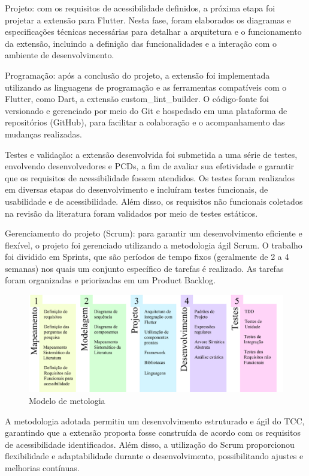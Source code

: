 Projeto: com os requisitos de acessibilidade definidos, a próxima etapa foi projetar a extensão para Flutter. Nesta fase, foram elaborados os diagramas e especificações técnicas necessárias para detalhar a arquitetura e o funcionamento da extensão, incluindo a definição das funcionalidades e a interação com o ambiente de desenvolvimento.

Programação: após a conclusão do projeto, a extensão foi implementada utilizando as linguagens de programação e as ferramentas compatíveis com o Flutter, como Dart, a extensão custom\_lint\_builder. O código-fonte foi versionado e gerenciado por meio do Git e hospedado em uma plataforma de repositórios (GitHub), para facilitar a colaboração e o acompanhamento das mudanças realizadas.

Testes e validação: a extensão desenvolvida foi submetida a uma série de testes, envolvendo desenvolvedores e PCDs, a fim de avaliar sua efetividade e garantir que os requisitos de acessibilidade fossem atendidos. Os testes foram realizados em diversas etapas do desenvolvimento e incluíram testes funcionais, de usabilidade e de acessibilidade. Além disso, os requisitos não funcionais coletados na revisão da literatura foram validados por meio de testes estáticos.

Gerenciamento do projeto (Scrum): para garantir um desenvolvimento eficiente e flexível, o projeto foi gerenciado utilizando a metodologia ágil Scrum. O trabalho foi dividido em Sprints, que são períodos de tempo fixos (geralmente de 2 a 4 semanas) nos quais um conjunto específico de tarefas é realizado. As tarefas foram organizadas e priorizadas em um Product Backlog.

\begin{figure}[!h]
	\centering
	\caption{Modelo de metologia}
	\includegraphics[scale=1]{Assets/Modelo de metodologia.png}
\end{figure}

A metodologia adotada permitiu um desenvolvimento estruturado e ágil do TCC, garantindo que a extensão proposta fosse construída de acordo com os requisitos de acessibilidade identificados. Além disso, a utilização do Scrum proporcionou flexibilidade e adaptabilidade durante o desenvolvimento, possibilitando ajustes e melhorias contínuas.

